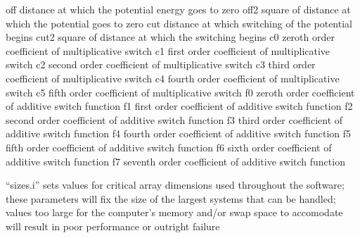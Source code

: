 \documentclass[letterpaper,11pt,english]{sphinxmanual}
\begin{document}
\begin{sphinxVerbatim}[commandchars=\\\{\}]
off             distance at which the potential energy goes to zero
off2            square of distance at which the potential goes to zero
cut             distance at which switching of the potential begins
cut2            square of distance at which the switching begins
c0              zeroth order coefficient of multiplicative switch
c1              first order coefficient of multiplicative switch
c2              second order coefficient of multiplicative switch
c3              third order coefficient of multiplicative switch
c4              fourth order coefficient of multiplicative switch
c5              fifth order coefficient of multiplicative switch
f0              zeroth order coefficient of additive switch function
f1              first order coefficient of additive switch function
f2              second order coefficient of additive switch function
f3              third order coefficient of additive switch function
f4              fourth order coefficient of additive switch function
f5              fifth order coefficient of additive switch function
f6              sixth order coefficient of additive switch function
f7              seventh order coefficient of additive switch function
\end{sphinxVerbatim}


“sizes.i” sets values for critical array dimensions used throughout the software; these parameters will fix the size of the largest systems that can be handled; values too large for   the computer’s memory and/or swap space to accomodate will result in poor performance or outright failure
\end{document}
